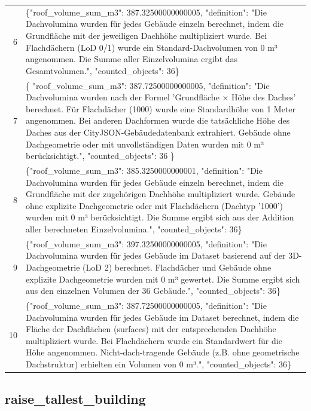 \documentclass[a4paper,11pt]{article}
\begin{document}
\begin{table}[ht]
\begin{tabular}{r p{12cm}}
6 & \{"roof\_volume\_sum\_m3": 387.32500000000005, "definition": "Die Dachvolumina wurden für jedes Gebäude einzeln berechnet, indem die Grundfläche mit der jeweiligen Dachhöhe multipliziert wurde. Bei Flachdächern (LoD 0/1) wurde ein Standard-Dachvolumen von 0 m³ angenommen. Die Summe aller Einzelvolumina ergibt das Gesamtvolumen.", "counted\_objects": 36\} \\
7 & \{
  "roof\_volume\_sum\_m3": 387.72500000000005,
  "definition": "Die Dachvolumina wurden nach der Formel 'Grundfläche × Höhe des Daches' berechnet. Für Flachdächer (1000) wurde eine Standardhöhe von 1 Meter angenommen. Bei anderen Dachformen wurde die tatsächliche Höhe des Daches aus der CityJSON-Gebäudedatenbank extrahiert. Gebäude ohne Dachgeometrie oder mit unvollständigen Daten wurden mit 0 m³ berücksichtigt.",
  "counted\_objects": 36
\} \\
8 & \{"roof\_volume\_sum\_m3": 385.3250000000001, "definition": "Die Dachvolumina wurden für jedes Gebäude einzeln berechnet, indem die Grundfläche mit der zugehörigen Dachhöhe multipliziert wurde. Gebäude ohne explizite Dachgeometrie oder mit Flachdächern (Dachtyp '1000') wurden mit 0 m³ berücksichtigt. Die Summe ergibt sich aus der Addition aller berechneten Einzelvolumina.", "counted\_objects": 36\} \\
9 & \{"roof\_volume\_sum\_m3": 397.32500000000005, "definition": "Die Dachvolumina wurden für jedes Gebäude im Dataset basierend auf der 3D-Dachgeometrie (LoD 2) berechnet. Flachdächer und Gebäude ohne explizite Dachgeometrie wurden mit 0 m³ gewertet. Die Summe ergibt sich aus den einzelnen Volumen der 36 Gebäude.", "counted\_objects": 36\} \\
10 & \{"roof\_volume\_sum\_m3": 387.72500000000005, "definition": "Die Dachvolumina wurden für jedes Gebäude im Dataset berechnet, indem die Fläche der Dachflächen (surfaces) mit der entsprechenden Dachhöhe multipliziert wurde. Bei Flachdächern wurde ein Standardwert für die Höhe angenommen. Nicht-dach-tragende Gebäude (z.B. ohne geometrische Dachstruktur) erhielten ein Volumen von 0 m³.", "counted\_objects": 36\} \\
\hline
\end{tabular}
\end{table}

\clearpage
\subsection{raise\_tallest\_building}
\end{document}
